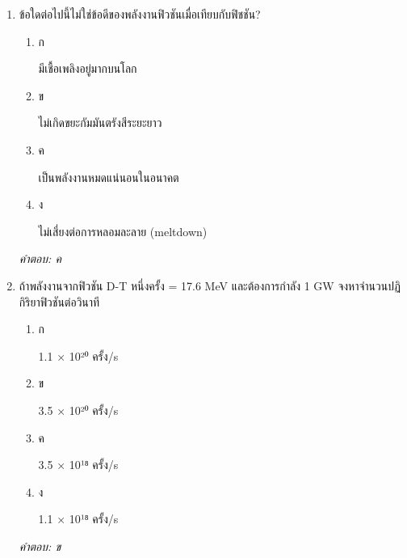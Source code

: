 \documentclass[12pt]{article}
\begin{document}
\begin{enumerate}[label=\arabic*., itemsep=0.5\baselineskip, topsep=0.5\baselineskip, leftmargin=*]
\item ข้อใดต่อไปนี้ไม่ใช่ข้อดีของพลังงานฟิวชันเมื่อเทียบกับฟิชชัน?
\begin{enumerate}[label=\alph*)., itemsep=0.3\baselineskip, topsep=0.3\baselineskip]
\item ก\ 
\begin{minipage}[t]{0.9\linewidth}
\raggedright มีเชื้อเพลิงอยู่มากบนโลก
\end{minipage}
\item ข\ 
\begin{minipage}[t]{0.9\linewidth}
\raggedright ไม่เกิดขยะกัมมันตรังสีระยะยาว
\end{minipage}
\item ค\ 
\begin{minipage}[t]{0.9\linewidth}
\raggedright เป็นพลังงานหมดแน่นอนในอนาคต
\end{minipage}
\item ง\ 
\begin{minipage}[t]{0.9\linewidth}
\raggedright ไม่เสี่ยงต่อการหลอมละลาย (meltdown)
\end{minipage}
\end{enumerate}
\vspace{-0.3\baselineskip}
\begin{small}
\textit{คำตอบ: ค}
\end{small}

\item ถ้าพลังงานจากฟิวชัน D-T หนึ่งครั้ง = 17.6 MeV และต้องการกำลัง 1 GW จงหาจำนวนปฏิกิริยาฟิวชันต่อวินาที
\begin{enumerate}[label=\alph*)., itemsep=0.3\baselineskip, topsep=0.3\baselineskip]
\item ก\ 
\begin{minipage}[t]{0.9\linewidth}
\raggedright 1.1 × 10²⁰ ครั้ง/s
\end{minipage}
\item ข\ 
\begin{minipage}[t]{0.9\linewidth}
\raggedright 3.5 × 10²⁰ ครั้ง/s
\end{minipage}
\item ค\ 
\begin{minipage}[t]{0.9\linewidth}
\raggedright 3.5 × 10¹⁸ ครั้ง/s
\end{minipage}
\item ง\ 
\begin{minipage}[t]{0.9\linewidth}
\raggedright 1.1 × 10¹⁸ ครั้ง/s
\end{minipage}
\end{enumerate}
\vspace{-0.3\baselineskip}
\begin{small}
\textit{คำตอบ: ข}
\end{small}


\end{enumerate}
\end{document}
